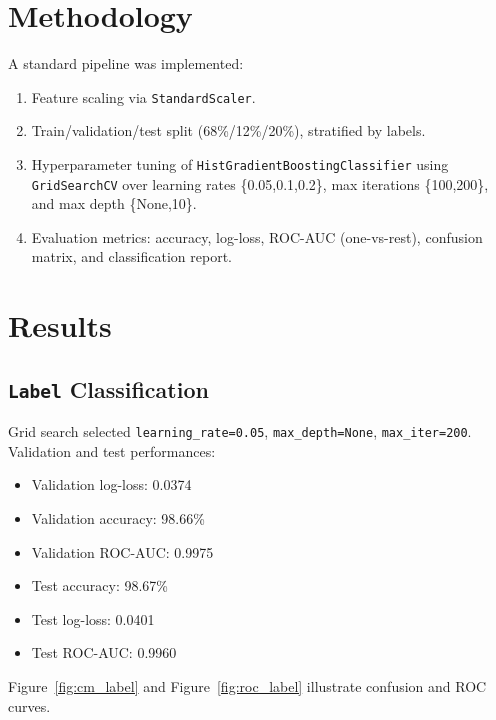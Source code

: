 \documentclass[12pt]{article}
\begin{document}
\section{Methodology}
A standard pipeline was implemented:
\begin{enumerate}
  \item Feature scaling via \texttt{StandardScaler}.
  \item Train/validation/test split (68\%/12\%/20\%), stratified by labels.
  \item Hyperparameter tuning of \texttt{HistGradientBoostingClassifier} using \texttt{GridSearchCV} over learning rates \{0.05,0.1,0.2\}, max iterations \{100,200\}, and max depth \{None,10\}.
  \item Evaluation metrics: accuracy, log-loss, ROC-AUC (one-vs-rest), confusion matrix, and classification report.
\end{enumerate}

\section{Results}

\subsection{\texttt{Label} Classification}
Grid search selected \texttt{learning\_rate=0.05}, \texttt{max\_depth=None}, \texttt{max\_iter=200}. Validation and test performances:
\begin{itemize}
  \item Validation log-loss: 0.0374
  \item Validation accuracy: 98.66\%
  \item Validation ROC-AUC: 0.9975
  \item Test accuracy: 98.67\%
  \item Test log-loss: 0.0401
  \item Test ROC-AUC: 0.9960
\end{itemize}

Figure~\ref{fig:cm_label} and Figure~\ref{fig:roc_label} illustrate confusion and ROC curves.
\end{document}
